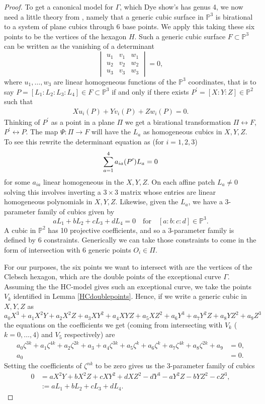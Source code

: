 \documentclass{amsart}
\begin{document}
\begin{proof}
To get a canonical model for $\Gamma$, which Dye show's has genus 4, we now need a little theory from \cite[pp.~122-124]{Semple1949}, namely that a generic cubic surface in $\mathbb{P}^3$ is birational to a system of plane cubics through 6 base points. We apply this taking these six points to be the vertices of the hexagon $H$. Such a generic cubic surface $F \subset \mathbb{P}^3$ can be written as the vanishing of a determinant 
\[
\begin{vmatrix} u_1 & v_1 & w_1 \\ u_2 & v_2 & w_2 \\ u_3 & v_3 & w_3 \end{vmatrix} = 0  , 
\]
where $u_1, \dots, w_3$ are linear homogeneous functions of the $\mathbb{P}^3$ coordinates, that is to say $P=[L_1 : L_2 : L_3 : L_4]\in F\subset \mathbb{P}^3$ if and only if there exists $P^\prime=[X : Y : Z] \in \mathbb{P}^2$ such that 
\begin{align*}
    X u_i(P) +Y v_i(P) + Z w_i(P) = 0  .
\end{align*}
Thinking of $P^\prime$ as a point in a plane $\Pi$ we get a birational transformation $\Pi \leftrightarrow F$, $P^\prime \leftrightarrow P$. The map $\Psi : \Pi \to F$ will have the $L_a$ as homogeneous cubics in $X, Y, Z$. To see this rewrite the determinant equation as (for $i=1,2,3$)
\[
\sum_{a=1}\sp{4} a_{ia}(P^\prime) L_a = 0
\]
for some $a_{ia}$ linear homogeneous in the $X,Y,Z$. On each affine patch $L_a \neq 0$ solving this involves inverting a $3 \times 3$ matrix whose entries are linear homogeneous polynomials in $X,Y,Z$. Likewise, given the $L_a$, we have a 3-parameter family of cubics given by 
\[
a L_1 + b L_2 + c L_3 + d L_4 = 0 \quad \text{for} \quad [a:b:c:d] \in \mathbb{P}^3  .
\]
A cubic in $\mathbb{P}^2$ has 10 projective coefficients, and so a 3-parameter family is defined by 6 constraints. Generically we can take those constraints to come in the form of intersection with 6 generic points $O_i \in \Pi$. 

For our purposes, the six points we  want to intersect with are the vertices of the Clebsch hexagon, which are the double points of the exceptional curve $\Gamma$. Assuming the the HC-model gives such an exceptional curve, we take the points $V_k$ identified in Lemma \ref{HCdoublepoints}. Hence, if we write a generic cubic in $X, Y, Z$ as 
\[
a_0 X^3 + a_1 X^2 Y + a_2 X^2 Z + a_3X Y^2 + a_4 X Y Z + a_5 X Z^2 + a_6 Y^3 + a_7 Y^2 Z + a_8 Y Z^2 + a_9 Z^3  
\]
the equations on the coefficients we get (coming from intersecting with $V_k$ ($k=0,\dots,4$) and $V_5$ respectively) are
\begin{align*}
    a_0 \zeta^{3k} + a_1 \zeta^{4k} + a_2 \zeta^{2k} + a_3 + a_4 \zeta^{3k} + a_5 \zeta^k + a_6 \zeta^{k} + a_7 \zeta^{4k} + a_8 \zeta^{2k} + a_9 &= 0, \\
    a_0   &= 0.  
\end{align*}
Setting the coefficients of $\zeta^{nk}$ to be zero gives us the 3-parameter family of cubics 
\begin{align*}
 0 &= a X^2 Y + b X^2 Z + cX Y^2  + d X Z^2 -d Y^3 -a Y^2 Z -b Y Z^2 -c Z^3  , \\
 &:= aL_1 + b L_2 + cL_3 + dL_4  .
\end{align*}


\end{proof}
\end{document}
